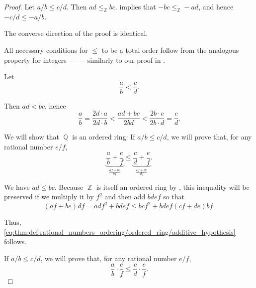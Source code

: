 \begin{proof}
   Let \( a / b \leq c / d \). Then \( ad \leq_\BbbZ bc \).  implies that \( -bc \leq_\BbbZ -ad \), and hence \( -c / d \leq - a / b \).

  The converse direction of the proof is identical.

   All necessary conditions for \( \leq \) to be a total order follow from the analogous property for integers ---  --- similarly to our proof in .

   Let
  \begin{equation*}
    \frac a b < \frac c d.
  \end{equation*}

  Then \( ad < bc \), hence
  \begin{equation*}
    \frac a b = \frac {2d \cdot a} {2d \cdot b} < \frac {ad + bc} {2bd} < \frac {2b \cdot c} {2b \cdot d} = \frac c d.
  \end{equation*}

   We will show that \( \BbbQ \) is an ordered ring:
   If \( a / b \leq c / d \), we will prove that, for any rational number \( e / f \),
  \begin{equation}\label{eq:thm:def:rational_numbers_ordering/ordered_ring/additive_hypothesis}
    \underbrace{\frac a b + \frac e f}_{\frac {af + be} {bf}} \leq \underbrace{\frac c d  + \frac e f}_{\frac {cf + de} {df}}.
  \end{equation}

  We have \( ad \leq bc \). Because \( \BbbZ \) is itself an ordered ring by , this inequality will be preserved if we multiply it by \( f^2 \) and then add \( bdef \) so that
  \begin{equation*}
    (af + be) df = adf^2 + bdef \leq bcf^2 + bdef (cf + de) bf.
  \end{equation*}

  Thus, \eqref{eq:thm:def:rational_numbers_ordering/ordered_ring/additive_hypothesis} follows.

   If \( a / b \leq c / d \), we will prove that, for any rational number \( e / f \),
  \begin{equation}\label{eq:thm:def:rational_numbers_ordering/ordered_ring/multiplicative_hypothesis}
    \frac a b \cdot \frac e f \leq \frac c d \cdot \frac e f.
  \end{equation}


\end{proof}
